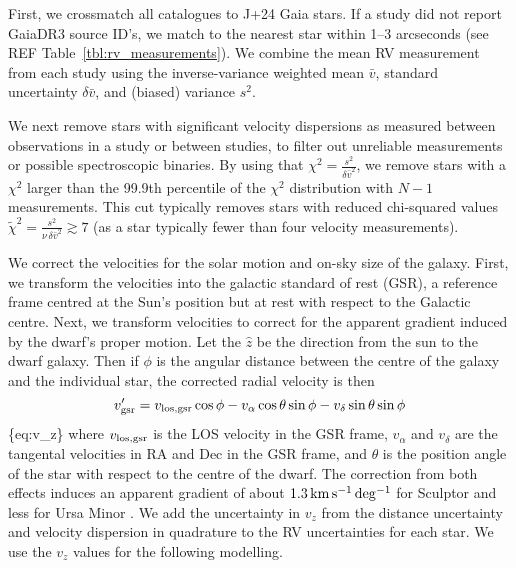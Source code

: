 First, we crossmatch all catalogues to J+24 Gaia stars. If a study did
not report GaiaDR3 source ID's, we match to the nearest star within 1--3
arcseconds (see REF Table~\ref{tbl:rv_measurements}). We combine the
mean RV measurement from each study using the inverse-variance weighted
mean \(\bar v\), standard uncertainty \(\delta \bar v\), and (biased)
variance \(s^2\).

We next remove stars with significant velocity dispersions as measured
between observations in a study or between studies, to filter out
unreliable measurements or possible spectroscopic binaries. By using
that \(\chi^2=\frac{s^2}{\delta \bar v^2}\), we remove stars with a
\(\chi^2\) larger than the 99.9th percentile of the \(\chi^2\)
distribution with \(N-1\) measurements. This cut typically removes stars
with reduced chi-squared values
\(\tilde\chi^2  = \frac{s^2}{\nu\,\delta \bar v^2}\gtrsim 7\) (as a star
typically fewer than four velocity measurements).

We correct the velocities for the solar motion and on-sky size of the
galaxy. First, we transform the velocities into the galactic standard of
rest (GSR), a reference frame centred at the Sun's position but at rest
with respect to the Galactic centre. Next, we transform velocities to
correct for the apparent gradient induced by the dwarf's proper motion.
Let the \(\hat z\) be the direction from the sun to the dwarf galaxy.
Then if \(\phi\) is the angular distance between the centre of the
galaxy and the individual star, the corrected radial velocity is then
\begin{equation}{
v_{\rm gsr}' = v_{\rm los, gsr}\cos\phi  - v_{\alpha}\cos\theta \sin\phi - v_\delta \sin\theta\sin\phi
}\end{equation} \{eq:v\_z\} where \(v_{\rm los, gsr}\) is the LOS
velocity in the GSR frame, \(v_\alpha\) and \(v_\delta\) are the
tangental velocities in RA and Dec in the GSR frame, and \(\theta\) is
the position angle of the star with respect to the centre of the dwarf.
The correction from both effects induces an apparent gradient of about
\(1.3\,{\rm km\,s^{-1}\,deg^{-1}}\) for Sculptor and less for Ursa Minor \citep[see
also][]{WMO2008, strigari2010}. We add the uncertainty in \(v_z\) from
the distance uncertainty and velocity dispersion in quadrature to the RV
uncertainties for each star. We use the \(v_z\) values for the following
modelling.

